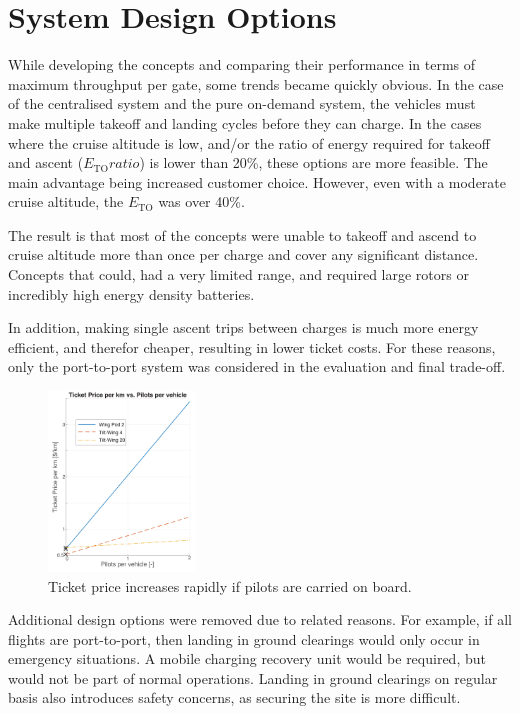 \section{System Design Options}
While developing the concepts and comparing their performance in terms of maximum throughput per gate, some trends became quickly obvious. In the case of the centralised system and the pure on-demand system, the vehicles must make multiple takeoff and landing cycles before they can charge. In the cases where the cruise altitude is low, and/or the ratio of energy required for takeoff and ascent ($E_\text{TO} ratio$) is lower than 20\%, these options are more feasible. The main advantage being increased customer choice. However, even with a moderate cruise altitude, the $E_\text{TO}$ was over 40\%.

The result is that most of the concepts were unable to takeoff and ascend to cruise altitude more than once per charge and cover any significant distance. Concepts that could, had a very limited range, and required large rotors or incredibly high energy density batteries.

In addition, making single ascent trips between charges is much more energy efficient, and therefor cheaper, resulting in lower ticket costs. For these reasons, only the port-to-port system was considered in the evaluation and final trade-off.

\begin{figure}
    \centering
    \includegraphics[width=0.35\textwidth]{Figures/Pilots_TPrice_perkm.png}
    \caption{Ticket price increases rapidly if pilots are carried on board.}
    \label{fig:pilotedcost}
\end{figure}

Additional design options were removed due to related reasons. For example, if all flights are port-to-port, then landing in ground clearings would only occur in emergency situations. A mobile charging recovery unit would be required, but would not be part of normal operations. Landing in ground clearings on regular basis also introduces safety concerns, as securing the site is more difficult.

